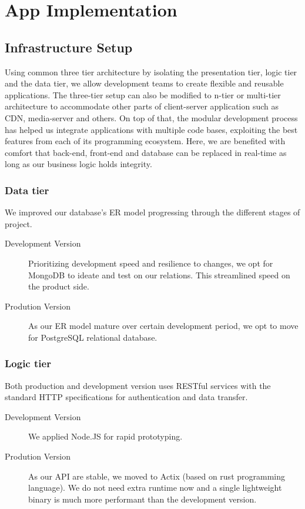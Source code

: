 \chapter{App Implementation}

\section{Infrastructure Setup}

Using common three tier architecture by isolating the presentation tier, logic tier and the data tier, we allow development teams to create flexible and reusable applications. The three-tier setup can also be modified to n-tier or multi-tier architecture to accommodate other parts of client-server application such as CDN, media-server and others. \cite{richards2020fundamentals} On top of that, the modular development process has helped us integrate applications with multiple code bases, exploiting the best features from each of its programming ecosystem. Here, we are benefited with comfort that back-end, front-end and database can be replaced in real-time as long as our business logic holds integrity.

\subsection{Data tier}

We improved our database's ER model progressing through the different stages of project.

\begin{description}
	\item[Development Version] Prioritizing development speed and resilience to changes, we opt for MongoDB to ideate and test on our relations. This streamlined speed on the product side.
	\item[Prodution Version] As our ER model mature over certain development period, we opt to move for PostgreSQL relational database.
\end{description}

\subsection{Logic tier}

Both production and development version uses RESTful services with the standard HTTP specifications for authentication and data transfer.

\begin{description}
	\item[Development Version] We applied Node.JS for rapid prototyping.
	\item[Prodution Version] As our API are stable, we moved to Actix (based on rust programming language). We do not need extra runtime now and a single lightweight binary is much more performant than the development version.
\end{description}

